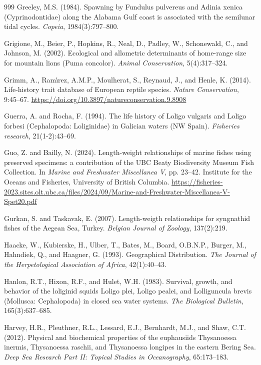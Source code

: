 \begin{thebibliography}{999}
Greeley, M.S. (1984). Spawning by Fundulus pulvereus and Adinia xenica (Cyprinodontidae) along the Alabama Gulf coast is associated with the semilunar tidal cycles. \textit{Copeia}, 1984(3):797--800.

Grigione, M., Beier, P., Hopkins, R., Neal, D., Padley, W., Schonewald, C., and Johnson, M. (2002). Ecological and allometric determinants of home-range size for mountain lions (Puma concolor). \textit{Animal Conservation}, 5(4):317--324.

Grimm, A., Ram{\'\i}rez, A.M.P., Moulherat, S., Reynaud, J., and Henle, K. (2014). Life-history trait database of European reptile species. \textit{Nature Conservation}, 9:45--67. \url{https://doi.org/10.3897/natureconservation.9.8908}

Guerra, A. and Rocha, F. (1994). The life history of Loligo vulgaris and Loligo forbesi (Cephalopoda: Loliginidae) in Galician waters (NW Spain). \textit{Fisheries research}, 21(1-2):43--69.

Guo, Z. and Bailly, N. (2024). Length-weight relationships of marine fishes using preserved specimens: a contribution of the {UBC} {Beaty} {Biodiversity} {Museum} {Fish} {Collection}. In \textit{Marine and Freshwater Miscellanea V}, pp. 23--42. Institute for the Oceans and Fisheries, University of British Columbia. \url{https://fisheries-2023.sites.olt.ubc.ca/files/2024/09/Marine-and-Freshwater-Miscellanea-V-Spet20.pdf}

Gurkan, S. and Taskavak, E. (2007). Length-weigth relationships for syngnathid fishes of the Aegean Sea, Turkey. \textit{Belgian Journal of Zoology}, 137(2):219.

Haacke, W., Kubierske, H., Ulber, T., Bates, M., Board, O.B.N.P., Burger, M., Hahndiek, Q., and Haagner, G. (1993). Geographical Distribution. \textit{The Journal of the Herpetological Association of Africa}, 42(1):40--43.

Hanlon, R.T., Hixon, R.F., and Hulet, W.H. (1983). Survival, growth, and behavior of the loliginid squids Loligo plei, Loligo pealei, and Lolliguncula brevis (Mollusca: Cephalopoda) in closed sea water systems. \textit{The Biological Bulletin}, 165(3):637--685.

Harvey, H.R., Pleuthner, R.L., Lessard, E.J., Bernhardt, M.J., and Shaw, C.T. (2012). Physical and biochemical properties of the euphausiids Thysanoessa inermis, Thysanoessa raschii, and Thysanoessa longipes in the eastern Bering Sea. \textit{Deep Sea Research Part II: Topical Studies in Oceanography}, 65:173--183.


\end{thebibliography}

